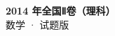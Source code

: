 \documentclass[zihao=-4, a4paper]{ctexart}
\begin{document}
\begin{center}
  {\Large\bfseries 2014 年全国Ⅱ卷（理科）}\\[4pt]
  {\large 数学 · 试题版}
\end{center}
\medskip
{}

\end{document}
